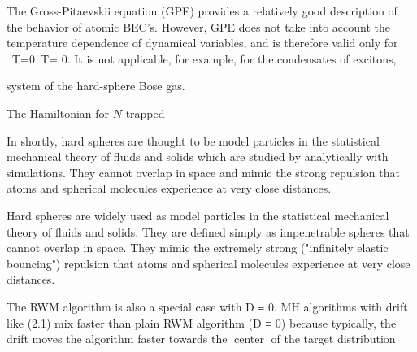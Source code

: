 The Gross-Pitaevskii equation (GPE) provides a relatively good description of the behavior of atomic BEC's. However, GPE does not take into account the temperature dependence of dynamical variables, and is therefore valid only for {\displaystyle \ T=0}\ T= 0. It is not applicable, for example, for the condensates of excitons, 


system of the hard-sphere Bose gas.

The Hamiltonian for $N$ trapped 




In shortly, hard spheres are thought to be model particles in the statistical mechanical theory of fluids and solids which are studied by analytically with simulations. They cannot overlap in space and mimic the strong repulsion that atoms and spherical molecules experience at very close distances. 

Hard spheres are widely used as model particles in the statistical mechanical theory of fluids and solids. They are defined simply as impenetrable spheres that cannot overlap in space. They mimic the extremely strong ("infinitely elastic bouncing") repulsion that atoms and spherical molecules experience at very close distances.


 The RWM algorithm is also a special case with
D ≡ 0. MH algorithms with drift like (2.1) mix faster than plain RWM algorithm (D ≡ 0) because
typically, the drift moves the algorithm faster towards the center of the target distribution